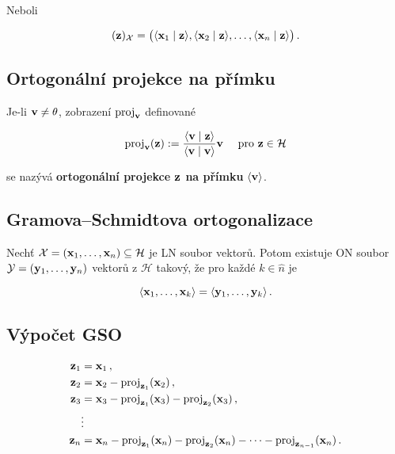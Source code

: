 \noindent Neboli

\[ (\mathbf{z})_{\mathcal X}=\big(\langle \mathbf{x}_1\mid \mathbf{z}\rangle, \langle \mathbf{x}_2\mid \mathbf{z}\rangle , \dots ,\langle \mathbf{x}_n\mid \mathbf{z}\rangle\big)\,. \]

\subsection*{Ortogonální projekce na přímku}

Je-li $\mathbf{v}\neq \theta$, zobrazení $\text{proj}_{\mathbf{v}}$ definované

\[ \text{proj}_{\mathbf{v}}(\mathbf{z}):=\frac{\langle \mathbf{v}\mid \mathbf{z}\rangle}{\langle \mathbf{v}\mid \mathbf{v}\rangle} \mathbf{v} \quad \text{ pro }\mathbf{z}\in \mathcal{H} \]

\noindent se nazývá \textbf{ortogonální projekce $\mathbf{z}$ na přímku} $\langle \mathbf{v}\rangle$.

\subsection*{Gramova--Schmidtova ortogonalizace}

Nechť $\mathcal{X}=(\mathbf{x}_1,\dots,\mathbf{x}_n)\subseteq \mathcal{H}$ je LN soubor
vektorů. Potom existuje ON soubor $\mathcal{Y}=(\mathbf{y}_1,\dots,\mathbf{y}_n)$ vektorů z
$\mathcal{H}$ takový, že pro každé $k\in \hat{n}$ je

\[ \langle\mathbf{x}_1,\dots,\mathbf{x}_k\rangle    =\langle\mathbf{y}_1,\dots,\mathbf{y}_k\rangle\,. \]

\subsection*{Výpočet GSO}

\begin{align*}
    \mathbf{z}_1&=\mathbf{x}_1\,,\\
    \mathbf{z}_2&=\mathbf{x}_2-
    \text{proj}_{\mathbf{z}_1}(\mathbf{x}_2)\,,\\
    \mathbf{z}_3&=\mathbf{x}_3-\text{proj}_{\mathbf{z}_1}(\mathbf{x}_3)-\text{proj}_{\mathbf{z}_2}(\mathbf{x}_3)\,,\\
    &\vdots\\
    \mathbf{z}_n&=\mathbf{x}_n-\text{proj}_{\mathbf{z}_1}(\mathbf{x}_n)-\text{proj}_{\mathbf{z}_2}(\mathbf{x}_n)-\dots -\text{proj}_{\mathbf{z}_{n-1}}(\mathbf{x}_n)\,.
\end{align*}

\pagebreak
